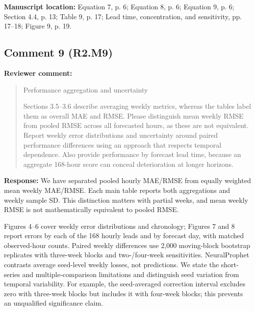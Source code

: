 \documentclass[11pt,a4paper]{article}
\begin{document}
\textbf{Manuscript location:} Equation 7, p. 6; Equation 8, p. 6; Equation 9, p. 6; Section 4.4, p. 13; Table 9, p. 17; Lead time, concentration, and sensitivity, pp. 17--18; Figure 9, p. 19.
\begin{samepage}
\subsection*{Comment 9 (R2.M9)}
\textbf{Reviewer comment:}
\begin{quote}\small Performance aggregation and uncertainty

Sections 3.5--3.6 describe averaging weekly metrics, whereas the tables label them as overall MAE and RMSE. Please distinguish mean weekly RMSE from pooled RMSE across all forecasted hours, as these are not equivalent. Report weekly error distributions and uncertainty around paired performance differences using an approach that respects temporal dependence. Also provide performance by forecast lead time, because an aggregate 168-hour score can conceal deterioration at longer horizons.\end{quote}
\end{samepage}
\textbf{Response:}
We have separated pooled hourly MAE/RMSE from equally weighted mean weekly MAE/RMSE. Each main table reports both aggregations and weekly sample SD. This distinction matters with partial weeks, and mean weekly RMSE is not mathematically equivalent to pooled RMSE.

Figures 4--6 cover weekly error distributions and chronology; Figures 7 and 8 report errors by each of the 168 hourly leads and by forecast day, with matched observed-hour counts. Paired weekly differences use 2,000 moving-block bootstrap replicates with three-week blocks and two-/four-week sensitivities. NeuralProphet contrasts average seed-level weekly losses, not predictions. We state the short-series and multiple-comparison limitations and distinguish seed variation from temporal variability. For example, the seed-averaged correction interval excludes zero with three-week blocks but includes it with four-week blocks; this prevents an unqualified significance claim.
\end{document}
